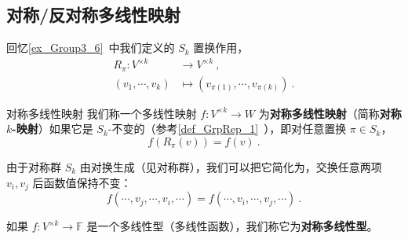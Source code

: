 
\begin{issues}
\issueDraft
\end{issues}


\subsection{对称/反对称多线性映射}

回忆\autoref{ex_Group3_6}~中我们定义的 $S_k$ 置换作用，
\begin{equation}
\begin{aligned}
R_\pi: V^{\times k} &\to V^{\times k}~, \\
(v_1, \cdots, v_k) &\mapsto (v_{\pi(1)}, \cdots, v_{\pi(k)})~.
\end{aligned}
\end{equation}

\begin{definition}{对称多线性映射}
我们称一个多线性映射 $f: V^{\times k} \to W$ 为\textbf{对称多线性映射}（简称\textbf{对称 $k$-映射}）如果它是 $S_k$-不变的（参考\autoref{def_GrpRep_1}~），即对任意置换 $\pi \in S_k$，
\begin{equation}
f(R_\pi(v)) = f(v)~.
\end{equation}

由于对称群 $S_k$ 由对换生成（见对称群），我们可以把它简化为，交换任意两项 $v_i, v_j$ 后函数值保持不变：
\begin{equation}
f(\cdots, v_j, \cdots, v_i, \cdots) = f(\cdots, v_i, \cdots, v_j, \cdots)~.
\end{equation}

如果 $f: V^{\times k} \to \mathbb{F}$ 是一个多线性型（多线性函数），我们称它为\textbf{对称多线性型}。
\end{definition}


%


